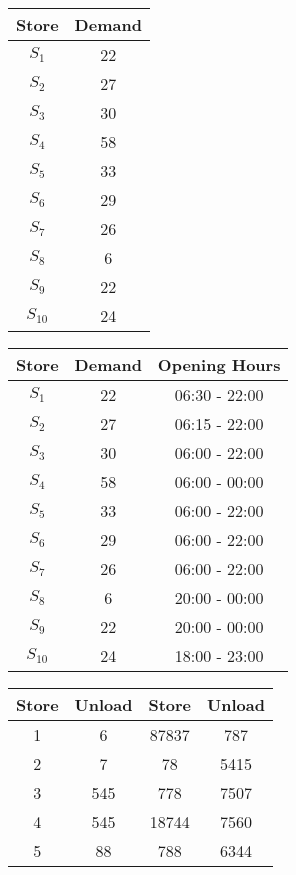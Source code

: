 \documentclass[11pt,paper=a4,parskip=half+]{article}
\newif\ifsolutions
\begin{document}
\solutionsfalse



\begin{tabular}{ | c | c |}
\hline
Store & Demand\\
\hline
$S_1$ & 22 \\
$S_2$ & 27  \\
$S_3$ & 30  \\
$S_4$ & 58  \\
$S_5$ & 33  \\
$S_6$ & 29  \\
$S_7$ & 26  \\
$S_8$ & 6  \\
$S_9$ & 22  \\
$S_{10}$& 24 \\
\hline
\end{tabular}
\bigskip

\begin{tabular}{ | c | c | c |}
\hline
Store & Demand & Opening Hours\\
\hline
$S_1$ & 22 & 06:30 - 22:00 \\
$S_2$ & 27 & 06:15 - 22:00 \\
$S_3$ & 30 & 06:00 - 22:00 \\
$S_4$ & 58 & 06:00 - 00:00 \\
$S_5$ & 33 & 06:00 - 22:00 \\
$S_6$ & 29 & 06:00 - 22:00 \\
$S_7$ & 26 & 06:00 - 22:00 \\
$S_8$ & 6  & 20:00 - 00:00 \\
$S_9$ & 22 & 20:00 - 00:00 \\
$S_{10}$& 24 & 18:00 - 23:00 \\
\hline
\end{tabular}


\begin{center}
\begin{tabular}{||c c c c||} 
\hline
Store & Unload & Store & Unload \\ [0.5ex] 
\hline\hline
1 & 6 & 87837 & 787 \\ 
\hline
2 & 7 & 78 & 5415 \\
\hline
3 & 545 & 778 & 7507 \\
\hline
4 & 545 & 18744 & 7560 \\
\hline
5 & 88 & 788 & 6344 \\ [1ex] 
\hline
\end{tabular}
\end{center}
\end{document}
